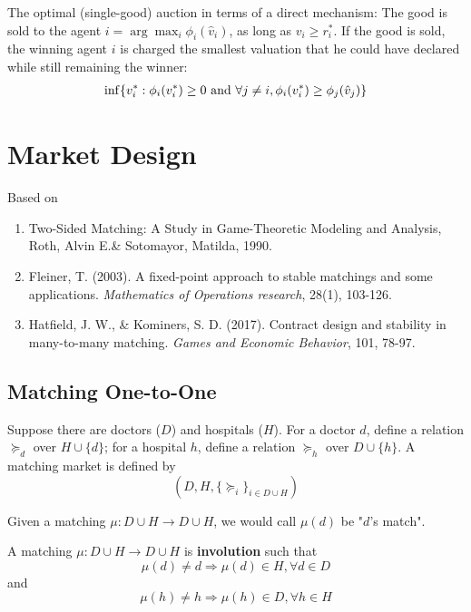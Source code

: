 \documentclass[11pt]{elegantbook}
\begin{document}
\begin{theorem}[Myerson (1981)]
    The optimal (single-good) auction in terms of a direct mechanism: The good is sold to the agent $i=\arg\max_i\phi_i(\hat{v}_i)$, as long as $v_i\geq r_i^*$. If the good is sold, the winning agent $i$ is charged the smallest valuation that he could have declared while still remaining the winner:
    \begin{equation}
        \begin{aligned}
            \inf\{v_i^*:\phi_i(v_i^*)\geq 0 \textnormal{ and }\forall j\neq i, \phi_i(v_i^*)\geq \phi_j(\hat{v}_j)\}
        \end{aligned}
        \nonumber
    \end{equation}
\end{theorem}



\chapter{Market Design}
Based on
\begin{enumerate}[$\circ$]
    \item Two-Sided Matching: A Study in Game-Theoretic Modeling and Analysis, Roth, Alvin E.\& Sotomayor, Matilda, 1990.
    \item Fleiner, T. (2003). A fixed-point approach to stable matchings and some applications. \textit{Mathematics of Operations research}, 28(1), 103-126.
    \item Hatfield, J. W., \& Kominers, S. D. (2017). Contract design and stability in many-to-many matching. \textit{Games and Economic Behavior}, 101, 78-97.
\end{enumerate}
\section{Matching One-to-One}
Suppose there are doctors ($D$) and hospitals ($H$). For a doctor $d$, define a relation $\succeq_d$ over $H\cup\{d\}$; for a hospital $h$, define a relation $\succeq_h$ over $D\cup\{h\}$. A matching market is defined by $$\left(D,H,\{\succeq_i\}_{i\in D\cup H}\right)$$

\begin{note}
    Given a matching $\mu: D\cup H \rightarrow D\cup H$, we would call $\mu(d)$ be "$d$'s match".
\end{note}

\begin{definition}[Involution]
    \normalfont
    A matching $\mu: D\cup H \rightarrow D\cup H$ is \textbf{involution} such that $$\mu (d)\neq d \Rightarrow \mu(d)\in H, \forall d\in D$$ and $$\mu (h)\neq h \Rightarrow \mu(h)\in D, \forall h\in H$$
\end{definition}
\end{document}
